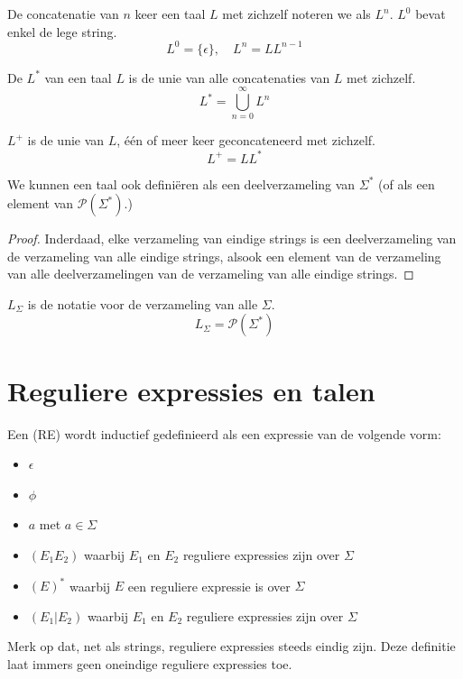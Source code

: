 \documentclass[main.tex]{subfiles}
\begin{document}
\begin{de}
  De concatenatie van $n$ keer een taal $L$ met zichzelf noteren we als $L^n$.
  $L^0$ bevat enkel de lege string.
  \[
  L^0 = \{\epsilon\},\quad L^{n} = LL^{n-1}
  \]
\end{de}

\begin{de}
  De  $L^*$ van een taal $L$ is de unie van alle concatenaties van $L$ met zichzelf.
  \[
  L^* = \bigcup_{n=0}^{\infty}L^n
  \]
\end{de}

\begin{de}
  $L^{+}$ is de unie van $L$, \'e\'en of meer keer geconcateneerd met zichzelf.
  \[
  L^{+} = LL^{*}
  \]
\end{de}

\begin{ei}
  \label{ei:taal-alternatieve-definitie}
  We kunnen een taal ook defini\"eren als een deelverzameling van $\Sigma^{*}$ (of als een element van $\mathcal{P}(\Sigma^{*})$.)

  \begin{proof}
    Inderdaad, elke verzameling van eindige strings is een deelverzameling van de verzameling van alle eindige strings, alsook een element van de verzameling van alle deelverzamelingen van de verzameling van alle eindige strings.
  \end{proof}
\end{ei}

\begin{de}
  $L_{\Sigma}$ is de notatie voor de verzameling van alle  $\Sigma$. 
  \[ L_{\Sigma} = \mathcal{P}(\Sigma^{*}) \]
\end{de}

\section{Reguliere expressies en talen}
\label{sec:reguliere-expressies-en-talen}

\begin{de}
  Een  (RE) wordt inductief gedefinieerd als een expressie van de volgende vorm:
  \begin{itemize}
  \item $\epsilon$
  \item $\phi$
  \item $a$ met $a \in \Sigma$
  \item $(E_1E_2)$ waarbij $E_1$ en $E_2$ reguliere expressies zijn over $\Sigma$
  \item $(E)^*$ waarbij $E$ een reguliere expressie is over $\Sigma$
  \item $(E_1|E_2)$ waarbij $E_1$ en $E_2$ reguliere expressies zijn over $\Sigma$
  \end{itemize}
  Merk op dat, net als strings, reguliere expressies steeds eindig zijn.
  Deze definitie laat immers geen oneindige reguliere expressies toe.
\end{de}
\end{document}
